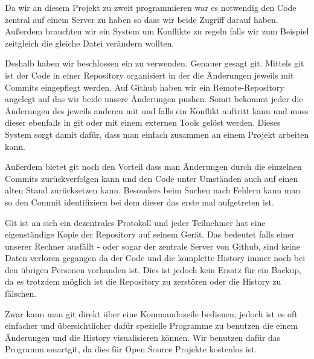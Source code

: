 Da wir an diesem Projekt zu zweit programmieren war es notwendig den Code zentral auf einem Server zu haben so dass wir beide Zugriff darauf haben.
Außerdem brauchten wir ein System um Konflikte zu regeln falls wir zum Beispiel zeitgleich die gleiche Datei verändern wollten.

Deshalb haben wir beschlossen ein  zu verwenden. Genauer gesagt git\cite{GIT}. Mittels git ist der Code in einer Repository organisiert in der die Änderungen jeweils mit Commits eingepflegt werden. Auf Github haben wir ein Remote-Repository angelegt auf das wir beide unsere Änderungen pushen. Somit bekommt jeder die Änderungen des jeweils anderen mit und falls ein Konflikt auftritt kann und muss dieser ebenfalls in git oder mit einem externen Tools gelöst werden. Dieses System sorgt damit dafür, dass man einfach zusammen an einem Projekt arbeiten kann.


Außerdem bietet git noch den Vorteil dass man Änderungen durch die einzelnen Commits zurückverfolgen kann und den Code unter Umständen auch auf einen alten Stand zurücksetzen kann. Besonders beim Suchen nach Fehlern kann man so den Commit identifiziern bei dem dieser das erste mal aufgetreten ist. 

Git ist an sich ein dezentrales Protokoll und jeder Teilnehmer hat eine eigenständige Kopie der Repository auf seinem Gerät. Das bedeutet falls einer unserer Rechner ausfällt - oder sogar der zentrale Server von Github, sind keine Daten verloren gegangen da der Code und die komplette History immer noch bei den übrigen Personen vorhanden ist. Dies ist jedoch kein Ersatz für ein Backup, da es trotzdem möglich ist die Repository zu zerstören oder die History zu fälschen.\cite[S 5f]{PGIT}

Zwar kann man git direkt über eine Kommandozeile bedienen, jedoch ist es oft einfacher und übersichtlicher dafür spezielle Programme zu benutzen die einem Änderungen und die History visualisieren können. Wir benutzen dafür das Programm smartgit, da dies für Open Source Projekte kostenlos ist.

